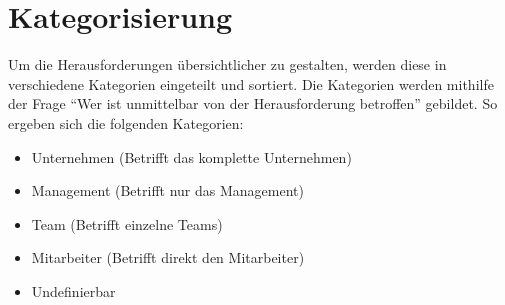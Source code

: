 \section{Kategorisierung} \label{Kap:Kategorisierung}

Um die Herausforderungen übersichtlicher zu gestalten, werden diese in verschiedene Kategorien eingeteilt und sortiert. Die Kategorien werden mithilfe der Frage \enquote{Wer ist unmittelbar von der Herausforderung betroffen} gebildet. So ergeben sich die folgenden Kategorien:

\begin{itemize}
	\item Unternehmen (Betrifft das komplette Unternehmen)
	\item Management (Betrifft nur das Management)
	\item Team (Betrifft einzelne Teams)
	\item Mitarbeiter (Betrifft direkt den Mitarbeiter)
	\item Undefinierbar
\end{itemize}

